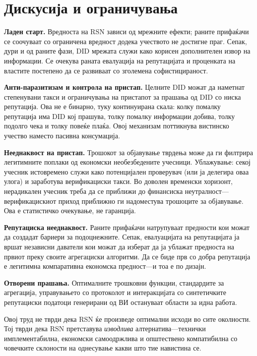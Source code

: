 \documentclass[11pt,a4paper,twocolumn]{article}
\begin{document}
\section{Дискусија и ограничувања}

\textbf{Ладен старт.} Вредноста на RSN зависи од мрежните ефекти; раните прифаќачи се соочуваат со ограничена вредност додека учеството не достигне праг. Сепак, дури и од раните фази, DID мрежата служи како корисен дополнителен извор на информации. Се очекува раната евалуација на репутацијата и проценката на властите постепено да се развиваат со зголемена софистицираност.

\textbf{Анти-паразитизам и контрола на пристап.} Целните DID можат да наметнат степенувани такси и ограничувања на пристапот за прашања од DID со ниска репутација. Ова не е бинарно, туку континуирана скала: колку помалку репутација има DID кој прашува, толку помалку информации добива, толку подолго чека и толку повеќе плаќа. Овој механизам поттикнува вистинско учество наместо пасивна консумација.

\textbf{Нееднаквост на пристап.} Трошокот за објавување тврдења може да ги филтрира легитимните поплаки од економски необезбедените учесници. Ублажување: секој учесник истовремено служи како потенцијален проверувач (или ја делегира оваа улога) и заработува верификациски такси. Во доволен временски хоризонт, нерадикален учесник треба да се приближи до финансиска неутралност---верификацискиот приход приближно ги надоместува трошоците за објавување. Ова е статистичко очекување, не гаранција.

\textbf{Репутациска нееднаквост.} Раните прифаќачи натрупуваат предности кои можат да создадат бариери за подоцнежните. Сепак, евалуацијата на репутацијата ја вршат независни даватели кои можат да изберат да ја ублажат предноста на првиот преку своите агрегациски алгоритми. Да се биде прв со добра репутација е легитимна компаративна економска предност---и тоа е по дизајн.

\textbf{Отворени прашања.} Оптималните трошковни функции, стандардите за агрегација, управувањето со протоколот и интеракцијата со синтетичките репутациски податоци генерирани од ВИ остануваат области за идна работа.

Овој труд не тврди дека RSN ќе произведе оптимални исходи во сите околности. Тој тврди дека RSN претставува \emph{изводлива} алтернатива---технички имплементабилна, економски самоодржлива и општествено компатибилна со човечките склоности на однесување какви што тие навистина се.
\end{document}
